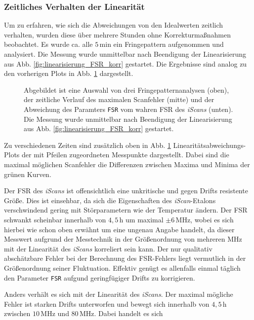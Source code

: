 \subsubsection{Zeitliches Verhalten
der Linearität}\label{subsubsec:linearitaet_verlauf}
Um zu erfahren, wie
sich die Abweichungen von den Idealwerten zeitlich verhalten, wurden diese über
mehrere Stunden ohne Korrekturmaßnahmen beobachtet. Es wurde ca. alle $5\,$min ein Fringepattern aufgenommen und analysiert. Die Messung wurde unmittelbar nach Beendigung der Linearisierung aus Abb.
\ref{fig:linearisierung_FSR_korr} gestartet.
Die Ergebnisse sind analog zu den vorherigen Plots in Abb.
\ref{fig:linearitaet_verlauf} dargestellt.
\begin{figure}
	 	\centering
	 	\footnotesize
		
		\caption[Linearitaet \textit{iScan}, zeitlicher Verlauf]{Abgebildet ist eine
		Auswahl von drei Fringepatternanalysen (oben), der zeitliche Verlauf des
		maximalen Scanfehler (mitte) und der Abweichung des Paramters \lstinline|FSR|
		vom wahren FSR des \textit{iScans} (unten). Die Messung wurde unmittelbar nach Beendigung der Linearisierung aus Abb.
		\ref{fig:linearisierung_FSR_korr} gestartet.}
		\label{fig:linearitaet_verlauf}
\end{figure}
Zu verschiedenen Zeiten sind zusätzlich oben in Abb.
\ref{fig:linearitaet_verlauf} Linearitätsabweichungs-Plots der mit Pfeilen
zugeordneten Messpunkte dargestellt. Dabei sind die maximal möglichen Scanfehler
die Differenzen zwischen Maxima und Minima der grünen Kurven.\par
Der FSR des
\textit{iScans} ist offensichtlich eine unkritische und gegen Drifts
resistente Größe. Dies ist einsehbar, da sich die Eigenschaften des
\textit{iScan}-Etalons verschwindend gering mit Störparametern wie der
Temperatur ändern. Der FSR schwankt scheinbar innerhalb von $4,5\,$h um maximal
$\pm6\,$MHz, wobei es sich hierbei wie schon oben erwähnt um eine ungenau Angabe handelt, da dieser Messwert aufgrund der Messtechnik in der Größenordnung von mehreren MHz mit der Linearität des \textit{iScans} korreliert sein kann. Der nur qualitativ abschätzbare Fehler bei
der Berechnung des FSR-Fehlers liegt vermutlich in der Größenordnung seiner
Fluktuation. Effektiv genügt es allenfalls einmal täglich den Parameter
\lstinline|FSR| aufgund geringfügiger Drifts zu korrigieren.\par
Anders verhält es sich mit der Linearität des \textit{iScans}.
Der maximal mögliche Fehler ist starken Drifts unterworfen und bewegt sich
innerhalb von $4,5\,$h zwischen $10\,$MHz und $80\,$MHz. Dabei handelt es sich

